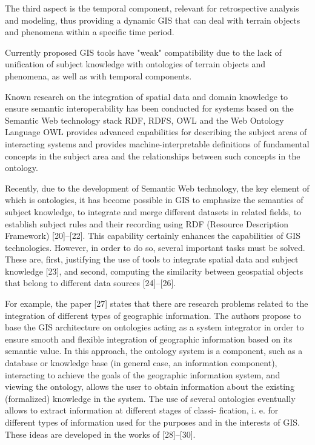 \documentclass[10pt, letterpaper, twoside]{article}
\begin{document}
\begin{multicols}{2}
The third aspect is the temporal component, relevant
for retrospective analysis and modeling, thus providing
a dynamic GIS that can deal with terrain objects and
phenomena within a specific time period.

Currently proposed GIS tools have "weak" compatibility due to the lack of unification of subject knowledge
with ontologies of terrain objects and phenomena, as well
as with temporal components.

Known research on the integration of spatial data and
domain knowledge to ensure semantic interoperability
has been conducted for systems based on the Semantic
Web technology stack RDF, RDFS, OWL and the Web
Ontology Language OWL provides advanced capabilities
for describing the subject areas of interacting systems
and provides machine-interpretable definitions of fundamental concepts in the subject area and the relationships
between such concepts in the ontology.

Recently, due to the development of Semantic Web
technology, the key element of which is ontologies, it
has become possible in GIS to emphasize the semantics
of subject knowledge, to integrate and merge different
datasets in related fields, to establish subject rules and
their recording using RDF (Resource Description Framework) [20]–[22]. This capability certainly enhances the
capabilities of GIS technologies. However, in order to
do so, several important tasks must be solved. These
are, first, justifying the use of tools to integrate spatial
data and subject knowledge [23], and second, computing
the similarity between geospatial objects that belong to
different data sources [24]–[26].

For example, the paper [27] states that there are
research problems related to the integration of different
types of geographic information. The authors propose
to base the GIS architecture on ontologies acting as a
system integrator in order to ensure smooth and flexible integration of geographic information based on its
semantic value. In this approach, the ontology system is
a component, such as a database or knowledge base (in
general case, an information component), interacting to
achieve the goals of the geographic information system,
and viewing the ontology, allows the user to obtain
information about the existing (formalized) knowledge
in the system. The use of several ontologies eventually
allows to extract information at different stages of classi-
fication, i. e. for different types of information used for
the purposes and in the interests of GIS. These ideas are
developed in the works of [28]–[30].


\end{multicols}
\end{document}

